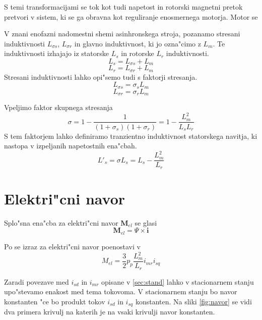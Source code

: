 \documentclass[journal,a4paper,twoside]{sty/IEEEtran}
\begin{document}
S temi transformacijami se tok kot tudi napetost in rotorski magnetni pretok pretvori v sistem, ki se ga obravna kot reguliranje enosmernega motorja.
Motor se 

V  znani enofazni nadomestni shemi asinhronskega stroja, pozanamo stresani induktivnosti $L_{\sigma s}$, $L_{\sigma r}$ in glavno induktivnost, ki jo ozna"cimo z $L_m$. Te induktivnosti izhajajo iz statorske $L_s$ in rotorske $L_r$ induktivnosti.
\begin{equation}
L_s=L_{\sigma s}+L_m
\end{equation}
\begin{equation}
L_r=L_{\sigma r}+L_m
\end{equation}
Stresani induktivnosti lahko opi"semo tudi s faktorji stresanja.
\begin{equation}
L_{\sigma s}= \sigma_sL_m
\end{equation}
\begin{equation}
L_{\sigma r}= \sigma_rL_m
\end{equation}

Vpeljimo faktor skupnega stresanja
\begin{equation}
\sigma=1-\frac{1}{(1+\sigma_s)(1+\sigma_r)}=1-\frac{L_m^2}{L_sL_r}
\end{equation}
S  tem faktorjem lahko definiramo tranzientno induktivnost statorskega navitja, ki nastopa v  izpeljanih napetostnih ena"cbah.\cite{servopogoni}
\begin{equation}
L'_s=\sigma L_s= L_s- \frac{L_m^2}{L_r}
\end{equation}

\section{Elektri"cni navor}

Splo"sna ena"cba za elektri"cni navor $\textbf{M}_{el}$ se glasi
\begin{equation}
\textbf{M}_{el}
=
\textbf{$\Psi$}
\times
\textbf{i}
\end{equation}

Po \cite{servopogoni} se izraz za elektri"cni navor poenostavi v
\begin{equation}
\label{eq:navor1}
M_{el}= \frac{3}{2}p_p \frac{L_m^2}{L_r}i_{mr}i_{sq}
\end{equation}

Zaradi povezave med $i_{sd}$ in $i_{mr}$ opisane v \ref{sec:stand} lahko v stacionarnem stanju upo"stevamo enakost med tema tokovoma. V stacionarnem stanju bo navor konstanten "ce bo produkt tokov $i_{sd}$ in $i_{sq}$ konstanten. Na sliki \ref{fig:navor} se vidi dva primera krivulj na katerih je na vsaki krivulji navor konstanten. 
\end{document}
